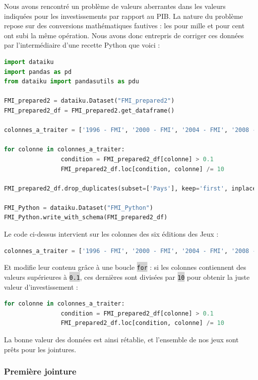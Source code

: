 \documentclass[hidelinks, 12pt]{article}
\newcommand{\code}[1]{\colorbox{LightGray}{\texttt{#1}}}
\begin{document}
Nous avons rencontré un problème de valeurs aberrantes dans les valeurs indiquées pour les investissements par rapport au PIB. La nature du problème repose sur des conversions mathématiques fautives : les pour mille et pour cent ont subi la même opération. Nous avons donc entrepris de corriger ces données par l'intermédiaire d'une recette Python que voici :

\begin{lstlisting}[language=python]
import dataiku
import pandas as pd
from dataiku import pandasutils as pdu

FMI_prepared2 = dataiku.Dataset("FMI_prepared2")
FMI_prepared2_df = FMI_prepared2.get_dataframe()

colonnes_a_traiter = ['1996 - FMI', '2000 - FMI', '2004 - FMI', '2008 - FMI', '2012 - FMI', '2016 - FMI']

for colonne in colonnes_a_traiter:
				condition = FMI_prepared2_df[colonne] > 0.1
				FMI_prepared2_df.loc[condition, colonne] /= 10

FMI_prepared2_df.drop_duplicates(subset=['Pays'], keep='first', inplace=True)

FMI_Python = dataiku.Dataset("FMI_Python")
FMI_Python.write_with_schema(FMI_prepared2_df)
\end{lstlisting}

Le code ci-dessus intervient sur les colonnes des six éditions des Jeux :

\begin{lstlisting}[language=python]	
colonnes_a_traiter = ['1996 - FMI', '2000 - FMI', '2004 - FMI', '2008 - FMI', '2012 - FMI', '2016 - FMI']
\end{lstlisting}

Et modifie leur contenu grâce à une boucle \code{for} : si les colonnes contiennent des valeurs supérieures à \code{0.1}, ces dernières sont divisées par \code{10} pour obtenir la juste valeur d'investissement :

\begin{lstlisting}[language=python]
for colonne in colonnes_a_traiter:
				condition = FMI_prepared2_df[colonne] > 0.1
				FMI_prepared2_df.loc[condition, colonne] /= 10
\end{lstlisting}

La bonne valeur des données est ainsi rétablie, et l'ensemble de nos jeux sont prêts pour les jointures.

\subsubsection{Première jointure}
\end{document}
